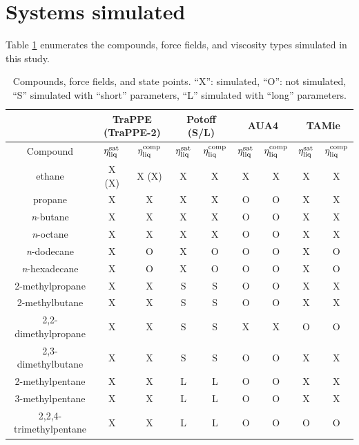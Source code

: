 \documentclass[preprint,review,11pt]{elsarticle}
\begin{document}
	\newpage
	
	\section{Systems simulated} \label{Systems simulated}
	
	Table \ref{tab:simulations_performed} enumerates the compounds, force fields, and viscosity types simulated in this study.
	
	\begin{table}[h!]
		\caption{Compounds, force fields, and state points. ``X'': simulated, ``O'': not simulated, ``S'' simulated with ``short'' parameters, ``L'' simulated with ``long'' parameters.} \label{tab:simulations_performed}
		\begin{center}
			\begin{tabular}{|c|c|c|c|c|c|c|c|c|}
				\hline
				\multicolumn{1}{|c}{} & \multicolumn{2}{|c}{TraPPE (TraPPE-2)} & \multicolumn{2}{|c|}{Potoff (S/L)} & \multicolumn{2}{|c}{AUA4} & \multicolumn{2}{|c|}{TAMie}  \\ \hline
				Compound & $\eta_{\rm liq}^{\rm sat}$ & $\eta_{\rm liq}^{\rm comp}$ & $\eta_{\rm liq}^{\rm sat}$ & $\eta_{\rm liq}^{\rm comp}$ & $\eta_{\rm liq}^{\rm sat}$ & $\eta_{\rm liq}^{\rm comp}$ & $\eta_{\rm liq}^{\rm sat}$ & $\eta_{\rm liq}^{\rm comp}$ \\ \hline
				ethane & X (X) & X (X) & X & X & X & X & X & X \\ \hline
				propane & X & X & X & X & O & O & X & X \\ \hline
				\textit{n}-butane & X & X & X & X & O & O & X & X \\ \hline
				\textit{n}-octane & X & X & X & X & O & O & X & X \\ \hline
				\textit{n}-dodecane & X & O & X & O & O & O & X & O \\ \hline
				\textit{n}-hexadecane & X & O & X & O & O & O & X & O \\ \hline
				2-methylpropane & X & X & S & S & O & O & X & X \\ \hline
				2-methylbutane & X & X & S & S & O & O & X & X \\ \hline
				2,2-dimethylpropane & X & X & S & S & X & X & O & O \\ \hline
				2,3-dimethylbutane & X & X & S & S & O & O & X & X \\ \hline
				2-methylpentane & X & X & L & L & O & O & X & X \\ \hline
				3-methylpentane & X & X & L & L & O & O & X & X \\ \hline
				2,2,4-trimethylpentane & X & X & L & L & O & O & O & O \\ \hline
			\end{tabular}
		\end{center} 
	\end{table}
\end{document}
